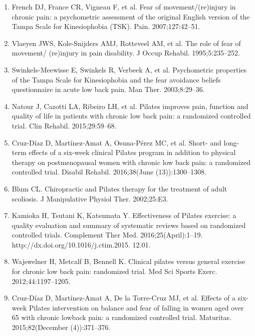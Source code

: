 \documentclass[a5paper]{article}
\theoremstyle{definition}
\begin{document}
\begin{enumerate}
\item
French DJ, France CR, Vigneau F, et al. Fear of movement/(re)injury in chronic pain:
a psychometric assessment of the original English version of the Tampa Scale for
Kinesiophobia (TSK). Pain. 2007;127:42–51.


\item
Vlaeyen JWS, Kole-Snijders AMJ, Rotteveel AM, et al. The role of fear of movement/
(re)injury in pain disability. J Occup Rehabil. 1995;5:235–252.


\item
Swinkels-Meewisse E, Swinkels R, Verbeek A, et al. Psychometric properties of the
Tampa Scale for Kinesiophobia and the fear avoidance beliefs questionnaire in acute
low back pain. Man Ther. 2003;8:29–36.

\item
Natour J, Cazotti LA, Ribeiro LH, et al. Pilates improves pain, function and quality of
life in patients with chronic low back pain: a randomized controlled trial. Clin Rehabil.
2015;29:59–68.


\item
Cruz-Díaz D, Martínez-Amat A, Osuna-Pérez MC, et al. Short- and long-term effects of
a six-week clinical Pilates program in addition to physical therapy on postmenopausal
women with chronic low back pain: a randomized controlled trial. Disabil Rehabil.
2016;38(June (13)):1300–1308.


\item
Blum CL. Chiropractic and Pilates therapy for the treatment of adult scoliosis. J
Manipulative Physiol Ther. 2002;25:E3.


\item
Kamioka H, Tsutani K, Katsumata Y. Effectiveness of Pilates exercise: a quality evaluation and summary of systematic reviews based on randomized controlled trials.
Complement Ther Med. 2016;25(April):1–19. http://dx.doi.org/10.1016/j.ctim.2015.
12.01.


\item
Wajswelner H, Metcalf B, Bennell K. Clinical pilates versus general exercise for
chronic low back pain: randomized trial. Med Sci Sports Exerc. 2012;44:1197–1205.


\item
Cruz-Díaz D, Martínez-Amat A, De la Torre-Cruz MJ, et al. Effects of a six-week Pilates
intervention on balance and fear of falling in women aged over 65 with chronic lowback pain: a randomized controlled trial. Maturitas. 2015;82(December (4)):371–376.



\end{enumerate}
\end{document}
